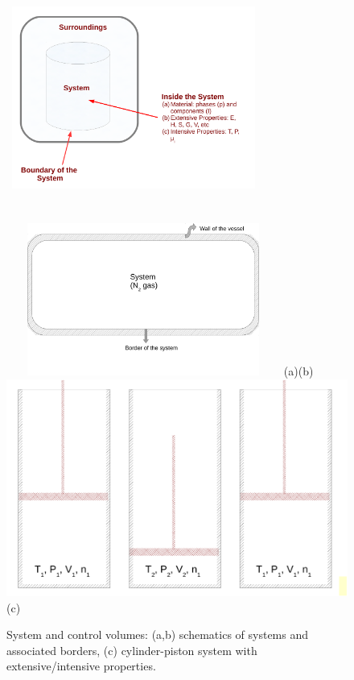       \begin{figure}[h]%
          \vbox{\hbox{
             \hspace{0.cm}\hbox{\includegraphics[width=8cm, height=8cm]{./../Pics/Fig_SystemDefinition}}
             \hspace{0.cm}\hbox{\includegraphics[width=9cm, height=5cm]{./../Pics/Fig_SystemDefinition2}}}
             \vspace{.1cm}
              \hbox{\hspace{3.5cm}(a)\hspace{8cm}(b)}
             \vspace{.5cm}
             \hspace{3cm}\hbox{\includegraphics[width=0.7\columnwidth,clip]{./../Pics/Fig_SystemDefinition3}}
             \vspace{.1cm}
              \hbox{\hspace{8cm}(c)}}
        \label{Chapter:Introduction:Fig:Domain}
        \caption{System and control volumes: (a,b) schematics of systems and associated borders, (c) cylinder-piston system with extensive/intensive properties.}
      \end{figure}

